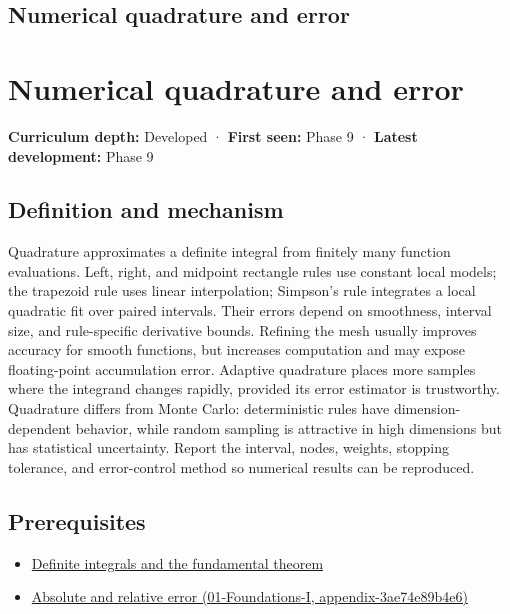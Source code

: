 \hypertarget{appendix-80521eae6b71}{}
\section*{Numerical quadrature and error}
\chapter{Numerical quadrature and error}\label{appendix-80521eae6b71-numerical-quadrature-and-error}

\textbf{Curriculum depth:} Developed · \textbf{First seen:} Phase 9 · \textbf{Latest development:} Phase 9

\section{Definition and mechanism}\label{appendix-80521eae6b71-definition-and-mechanism}

Quadrature approximates a definite integral from finitely many function evaluations. Left, right, and midpoint rectangle rules use constant local models; the trapezoid rule uses linear interpolation; Simpson's rule integrates a local quadratic fit over paired intervals. Their errors depend on smoothness, interval size, and rule-specific derivative bounds. Refining the mesh usually improves accuracy for smooth functions, but increases computation and may expose floating-point accumulation error. Adaptive quadrature places more samples where the integrand changes rapidly, provided its error estimator is trustworthy. Quadrature differs from Monte Carlo: deterministic rules have dimension-dependent behavior, while random sampling is attractive in high dimensions but has statistical uncertainty. Report the interval, nodes, weights, stopping tolerance, and error-control method so numerical results can be reproduced.

\section{Prerequisites}\label{appendix-80521eae6b71-prerequisites}

\begin{itemize}
\tightlist
\item
  \hyperref[appendix-1a50e72435c2]{Definite integrals and the fundamental theorem}
\item
  \href{../01-Foundations-I/main.pdf\#nameddest=appendix-3ae74e89b4e6}{Absolute and relative error (01-Foundations-I, appendix-3ae74e89b4e6)}
\end{itemize}

